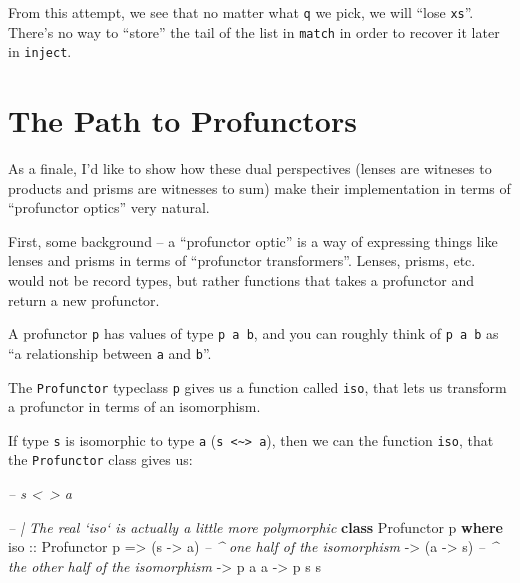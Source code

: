 \documentclass[]{article}
\newenvironment{Shaded}{}{}
\newcommand{\CommentTok}[1]{\textcolor[rgb]{0.38,0.63,0.69}{\textit{#1}}}
\newcommand{\DataTypeTok}[1]{\textcolor[rgb]{0.56,0.13,0.00}{#1}}
\newcommand{\KeywordTok}[1]{\textcolor[rgb]{0.00,0.44,0.13}{\textbf{#1}}}
\newcommand{\NormalTok}[1]{#1}
\newcommand{\OtherTok}[1]{\textcolor[rgb]{0.00,0.44,0.13}{#1}}
\begin{document}
From this attempt, we see that no matter what \texttt{q} we pick, we will ``lose
\texttt{xs}''. There's no way to ``store'' the tail of the list in
\texttt{match} in order to recover it later in \texttt{inject}.

\hypertarget{the-path-to-profunctors}{%
\section{The Path to Profunctors}\label{the-path-to-profunctors}}

As a finale, I'd like to show how these dual perspectives (lenses are witneses
to products and prisms are witnesses to sum) make their implementation in terms
of ``profunctor optics'' very natural.

First, some background -- a ``profunctor optic'' is a way of expressing things
like lenses and prisms in terms of ``profunctor transformers''. Lenses, prisms,
etc. would not be record types, but rather functions that takes a profunctor and
return a new profunctor.

A profunctor \texttt{p} has values of type \texttt{p\ a\ b}, and you can roughly
think of \texttt{p\ a\ b} as ``a relationship between \texttt{a} and
\texttt{b}''.

The \texttt{Profunctor} typeclass \texttt{p} gives us a function called
\texttt{iso}, that lets us transform a profunctor in terms of an isomorphism.

If type \texttt{s} is isomorphic to type \texttt{a}
(\texttt{s\ \textless{}\textasciitilde{}\textgreater{}\ a}), then we can the
function \texttt{iso}, that the \texttt{Profunctor} class gives us:

\begin{Shaded}
\begin{Highlighting}[]
\CommentTok{-- s <~> a}

\CommentTok{-- | The real `iso` is actually a little more polymorphic}
\KeywordTok{class} \DataTypeTok{Profunctor}\NormalTok{ p }\KeywordTok{where}
\OtherTok{    iso ::} \DataTypeTok{Profunctor}\NormalTok{ p}
        \OtherTok{=>}\NormalTok{ (s }\OtherTok{->}\NormalTok{ a)         }\CommentTok{-- ^ one half of the isomorphism}
        \OtherTok{->}\NormalTok{ (a }\OtherTok{->}\NormalTok{ s)         }\CommentTok{-- ^ the other half of the isomorphism}
        \OtherTok{->}\NormalTok{ p a a}
        \OtherTok{->}\NormalTok{ p s s}
\end{Highlighting}
\end{Shaded}
\end{document}
